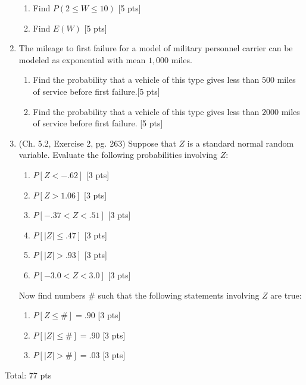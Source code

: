 \documentclass[11pt]{article}\usepackage[]{graphicx}\usepackage[]{color}
\begin{document}
\begin{enumerate}
\begin{enumerate}
                   \item  Find $P(2 \le W \le 10)$ [5 pts]
                   
                   \item  Find $E(W)$ [5 pts]

      \end{enumerate}

  \item The mileage to first failure for a model of military personnel carrier can be modeled as exponential with mean $1,000$ miles.
  
          \begin{enumerate}
                \item Find the probability that a vehicle of this type gives less than $500$ miles of service before first failure.[5 pts] 
                
                \item Find the probability that a vehicle of this type gives less than $2000$ miles of service before first failure. [5 pts]
                
          \end{enumerate}
          
  \item (Ch. 5.2, Exercise 2, pg. 263) Suppose that $Z$ is a standard normal random variable. Evaluate the following probabilities involving $Z$: 
  
          \begin{enumerate}
                \item $P[Z < -.62]$ [3 pts]
                \item $P[Z > 1.06]$ [3 pts]
                \item $P[-.37 < Z < .51]$ [3 pts]
                \item $P[|Z| \le .47]$ [3 pts]
                \item $P[|Z| > .93]$ [3 pts]
                \item $P[-3.0 < Z < 3.0]$ [3 pts]
          \end{enumerate}      
    
    Now find numbers $\#$ such that the following statements involving $Z$ are true:
          \begin{enumerate}
                    \item $P[Z \le \#] = .90$ [3 pts]
                    \item  $P[|Z| \le \#] = .90$ [3 pts]
                    \item $P[|Z| > \#] = .03$ [3 pts]
          \end{enumerate}          




\end{enumerate}
Total: 77 pts
\end{document}
